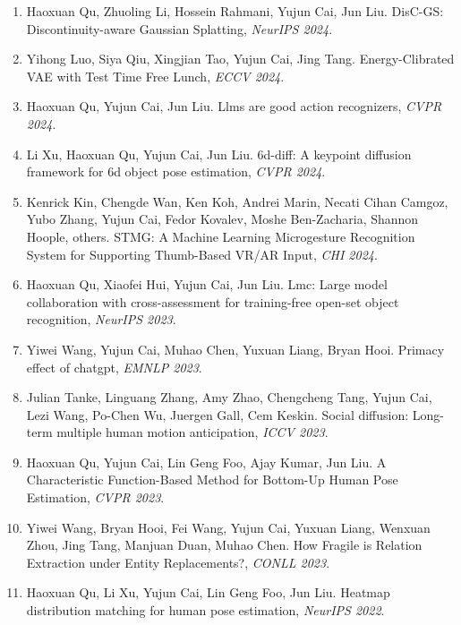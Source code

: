 \begin{enumerate}
\item Haoxuan Qu, Zhuoling Li, Hossein Rahmani, Yujun Cai, Jun Liu. DisC-GS: Discontinuity-aware Gaussian Splatting, \textit{NeurIPS 2024}.

\item Yihong Luo, Siya Qiu, Xingjian Tao, Yujun Cai, Jing Tang. Energy-Clibrated VAE with Test Time Free Lunch, \textit{ECCV 2024}.

\item Haoxuan Qu, Yujun Cai, Jun Liu. Llms are good action recognizers, \textit{CVPR 2024}.

\item Li Xu, Haoxuan Qu, Yujun Cai, Jun Liu. 6d-diff: A keypoint diffusion framework for 6d object pose estimation, \textit{CVPR 2024}.

\item Kenrick Kin, Chengde Wan, Ken Koh, Andrei Marin, Necati Cihan Camgoz, Yubo Zhang, Yujun Cai, Fedor Kovalev, Moshe Ben-Zacharia, Shannon Hoople, others. STMG: A Machine Learning Microgesture Recognition System for Supporting Thumb-Based VR/AR Input, \textit{CHI 2024}.

\item Haoxuan Qu, Xiaofei Hui, Yujun Cai, Jun Liu. Lmc: Large model collaboration with cross-assessment for training-free open-set object recognition, \textit{NeurIPS 2023}.

\item Yiwei Wang, Yujun Cai, Muhao Chen, Yuxuan Liang, Bryan Hooi. Primacy effect of chatgpt, \textit{EMNLP 2023}.

\item Julian Tanke, Linguang Zhang, Amy Zhao, Chengcheng Tang, Yujun Cai, Lezi Wang, Po-Chen Wu, Juergen Gall, Cem Keskin. Social diffusion: Long-term multiple human motion anticipation, \textit{ICCV 2023}.

\item Haoxuan Qu, Yujun Cai, Lin Geng Foo, Ajay Kumar, Jun Liu. A Characteristic Function-Based Method for Bottom-Up Human Pose Estimation, \textit{CVPR 2023}.

\item Yiwei Wang, Bryan Hooi, Fei Wang, Yujun Cai, Yuxuan Liang, Wenxuan Zhou, Jing Tang, Manjuan Duan, Muhao Chen. How Fragile is Relation Extraction under Entity Replacements?, \textit{CONLL 2023}.

\item Haoxuan Qu, Li Xu, Yujun Cai, Lin Geng Foo, Jun Liu. Heatmap distribution matching for human pose estimation, \textit{NeurIPS 2022}.


\end{enumerate}

